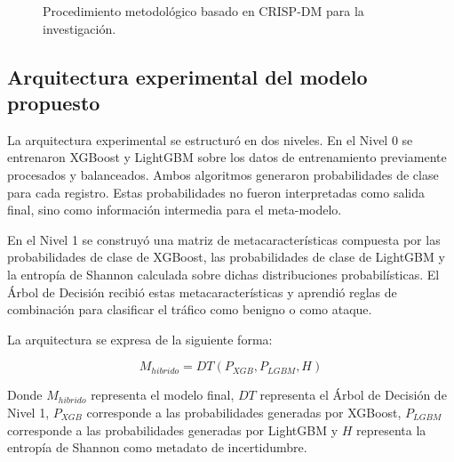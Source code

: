 \documentclass[12pt,a4paper]{article}
\begin{document}
\begin{figure}[H]
\centering
{}
\caption{Procedimiento metodológico basado en CRISP-DM para la investigación.}
\end{figure}

\subsection{Arquitectura experimental del modelo propuesto}

La arquitectura experimental se estructuró en dos niveles. En el Nivel 0 se entrenaron XGBoost y LightGBM sobre los datos de entrenamiento previamente procesados y balanceados. Ambos algoritmos generaron probabilidades de clase para cada registro. Estas probabilidades no fueron interpretadas como salida final, sino como información intermedia para el meta-modelo.

En el Nivel 1 se construyó una matriz de metacaracterísticas compuesta por las probabilidades de clase de XGBoost, las probabilidades de clase de LightGBM y la entropía de Shannon calculada sobre dichas distribuciones probabilísticas. El Árbol de Decisión recibió estas metacaracterísticas y aprendió reglas de combinación para clasificar el tráfico como benigno o como ataque.

La arquitectura se expresa de la siguiente forma:

\[
M_{hibrido}=DT(P_{XGB},P_{LGBM},H)
\]

Donde $M_{hibrido}$ representa el modelo final, $DT$ representa el Árbol de Decisión de Nivel 1, $P_{XGB}$ corresponde a las probabilidades generadas por XGBoost, $P_{LGBM}$ corresponde a las probabilidades generadas por LightGBM y $H$ representa la entropía de Shannon como metadato de incertidumbre.
\end{document}
